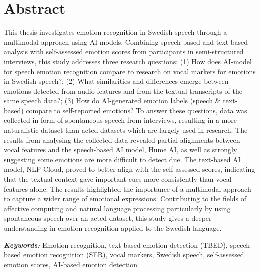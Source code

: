 \newpage
\chapter*{Abstract}
{}

This thesis investigates emotion recognition in Swedish speech through a multimodal approach using AI models. Combining speech-based and text-based analysis with self-assessed emotion scores from participants in semi-structured interviews, this study addresses three research questions: (1) How does AI-model for speech emotion recognition compare to research on vocal markers for emotions in Swedish speech?; (2) What similarities and differences emerge between emotions detected from audio features and from the textual transcripts of the same speech data?; (3) How do AI-generated emotion labels (speech \& text-based) compare to self-reported emotions?
To answer these questions, data was collected in form of spontaneous speech from interviews, resulting in a more naturalistic dataset than acted datasets which are largely used in research. The results from analysing the collected data revealed partial alignments between vocal features and the speech-based AI model, Hume AI, as well as strongly suggesting some emotions are more difficult to detect due. The text-based AI model, NLP Cloud, proved to better align with the self-assessed scores, indicating that the textual context gave important cues more consistently than vocal features alone. The results highlighted the importance of a multimodal approach to capture a wider range of emotional expressions. 
Contributing to the fields of affective computing and natural language processing particularly by using spontaneous speech over an acted dataset, this study gives a deeper understanding in emotion recognition applied to the Swedish language.

\vspace{0.6cm}
{

{\parindent=0cm\Large\textit{\textbf{Keywords:}}}
Emotion recognition, text-based emotion detection (TBED), speech-based emotion recognition (SER), vocal markers, Swedish speech, self-assessed emotion scores, AI-based emotion detection

\vspace{0.3cm}


}
